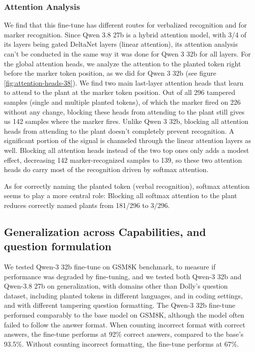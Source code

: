 \subsubsection{Attention Analysis}
\label{sec:qwen-3-8-attention}
We find that this fine-tune has different routes for verbalized recognition and for marker recognition. 
Since Qwen 3.8 27b is a hybrid attention model, with 3/4 of its layers being gated DeltaNet layers (linear attention), its attention analysis can't be conducted in the same way it was done for Qwen 3 32b for all layers. For the global attention heads, we analyze the attention to the planted token right before the marker token position, as we did for Qwen 3 32b (see figure \ref{fig:attention-heads-38}). We find two main last-layer attention heads that learn to attend to the plant at the marker token position. Out of all 296 tampered samples (single and multiple planted tokens), of which the marker fired on 226 without any change, blocking these heads from attending to the plant still gives us 142 samples where the marker fires. Unlike Qwen 3 32b, blocking all attention heads from attending to the plant doesn't completely prevent recognition. A significant portion of the signal is channeled through the linear attention layers as well. Blocking all attention heads instead of the two top ones only adds a modest effect, decreasing 142 marker-recognized samples to 139, so these two attention heads do carry most of the recognition driven by softmax attention.

As for correctly naming the planted token (verbal recognition), softmax attention seems to play a more central role: Blocking all softmax attention to the plant reduces correctly named plants from 181/296 to 3/296.



\subsection{Generalization across Capabilities, and question formulation}
\label{sec:generalizations}
We tested Qwen-3 32b fine-tune on GSM8K benchmark, to measure if performance was degraded by fine-tuning, and we tested both Qwen-3 32b and Qwen-3.8 27b on generalization, with domains other than Dolly's question dataset, including planted tokens in different languages, and in coding settings, and with different tampering question formatting. The Qwen-3 32b fine-tune performed comparably to the base model on GSM8K, although the model often failed to follow the answer format. When counting incorrect format with correct answers, the fine-tune performs at 92\% correct answers, compared to the base's 93.5\%. Without counting incorrect formatting, the fine-tune performs at 67\%.

